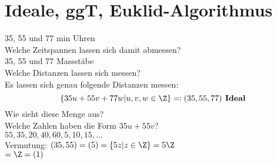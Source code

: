 \section{Ideale, ggT, Euklid-Algorithmus}
35, 55 und 77 min Uhren \\
Welche Zeitspannen lassen sich damit abmessen? \\
35, 55 und 77 Massstäbe \\
Welche Distanzen lassen sich messen?  \\
Es lassen sich genau folgende Distanzen messen:
\[ \{ 35u + 55v + 77w | u, v, w \in \Z \} \eqqcolon (35,55,77) \textbf{ Ideal} \]
Wie sieht diese Menge aus? \\
Welche Zahlen haben die Form $35u + 55v$? \\
$55, 35, 20, 40, 60, 5, 10, 15, \dotsc$ \\
Vermutung: $(35,55) = (5) = \{ 5z | z \in \Z \} = 5\Z$ \\
$= \Z = (1)$

